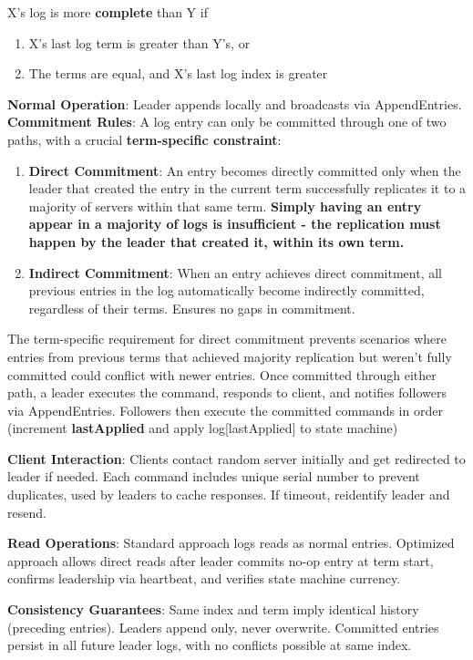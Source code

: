 \documentclass[8pt, landscape]{extarticle}
\begin{document}
\begin{multicols*}{4}
X's log is more \textbf{complete} than Y if
\begin{enumerate}
    \item X's last log term is greater than Y's, or
    \item The terms are equal, and X's last log index is greater
\end{enumerate}
\textbf{Normal Operation}: Leader appends locally and broadcasts via AppendEntries. \\
\textbf{Commitment Rules}:
A log entry can only be committed through one of two paths, with a crucial \textbf{term-specific constraint}:
\begin{enumerate}
    \item \textbf{Direct Commitment}: An entry becomes directly committed only when the leader that created the entry in the current term successfully replicates it to a majority of servers within that same term. \textbf{Simply having an entry appear in a majority of logs is insufficient - the replication must happen by the leader that created it, within its own term.}
    
    \item \textbf{Indirect Commitment}: When an entry achieves direct commitment, all previous entries in the log automatically become indirectly committed, regardless of their terms. Ensures no gaps in commitment.
\end{enumerate}

The term-specific requirement for direct commitment prevents scenarios where entries from previous terms that achieved majority replication but weren't fully committed could conflict with newer entries. Once committed through either path, a leader executes the command, responds to client, and notifies followers via AppendEntries. Followers then execute the committed commands in order (increment \textbf{lastApplied} and apply log[lastApplied] to state machine)

\textbf{Client Interaction}: 
Clients contact random server initially and get redirected to leader if needed. Each command includes unique serial number to prevent duplicates, used by leaders to cache responses. If timeout, reidentify leader and resend.

\textbf{Read Operations}:
Standard approach logs reads as normal entries. Optimized approach allows direct reads after leader commits no-op entry at term start, confirms leadership via heartbeat, and verifies state machine currency.

\textbf{Consistency Guarantees}:
Same index and term imply identical history (preceding entries). Leaders append only, never overwrite. Committed entries persist in all future leader logs, with no conflicts possible at same index.


\end{multicols*}
\end{document}
